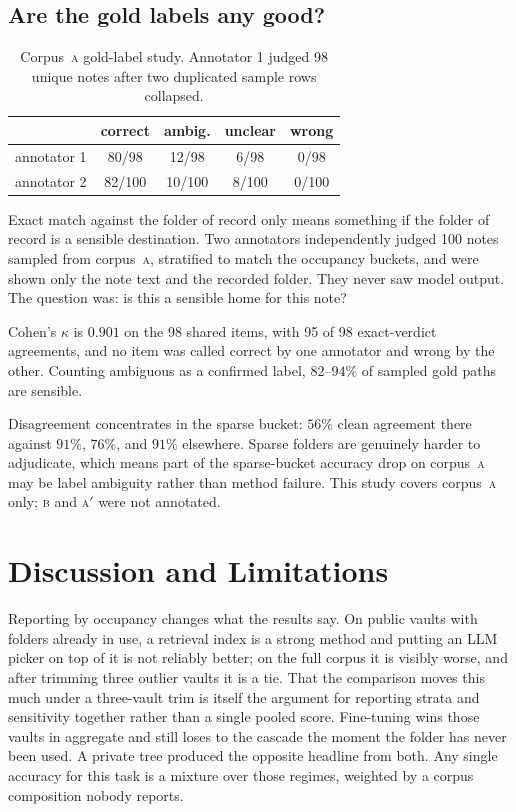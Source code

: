 \documentclass[11pt]{article}
\newcommand{\corpA}{\textsc{a}}
\newcommand{\corpB}{\textsc{b}}
\newcommand{\corpAp}{\textsc{a}$'$}
\begin{document}
\subsection{Are the gold labels any good?}
\label{sec:annotation}

\begin{table}[t]
  \centering
  \small
  \begin{tabular}{lcccc}
    \toprule
    & correct & ambig. & unclear & wrong \\
    \midrule
    annotator 1 & 80/98  & 12/98 & 6/98 & 0/98 \\
    annotator 2 & 82/100 & 10/100 & 8/100 & 0/100 \\
    \bottomrule
  \end{tabular}
  \caption{Corpus~\corpA{} gold-label study. Annotator 1 judged 98 unique notes after two duplicated sample rows collapsed.}
  \label{tab:annotation}
\end{table}

Exact match against the folder of record only means something if the folder of record is a sensible destination.
Two annotators independently judged 100 notes sampled from corpus~\corpA{}, stratified to match the occupancy buckets, and were shown only the note text and the recorded folder.
They never saw model output.
The question was: is this a sensible home for this note?

Cohen's $\kappa$ is $0.901$ on the 98 shared items, with 95 of 98 exact-verdict agreements, and no item was called correct by one annotator and wrong by the other.
Counting ambiguous as a confirmed label, $82$--$94\%$ of sampled gold paths are sensible.

Disagreement concentrates in the sparse bucket: $56\%$ clean agreement there against $91\%$, $76\%$, and $91\%$ elsewhere.
Sparse folders are genuinely harder to adjudicate, which means part of the sparse-bucket accuracy drop on corpus~\corpA{} may be label ambiguity rather than method failure.
This study covers corpus~\corpA{} only; \corpB{} and \corpAp{} were not annotated.

\section{Discussion and Limitations}
\label{sec:discussion}

Reporting by occupancy changes what the results say.
On public vaults with folders already in use, a retrieval index is a strong method and putting an LLM picker on top of it is not reliably better; on the full corpus it is visibly worse, and after trimming three outlier vaults it is a tie.
That the comparison moves this much under a three-vault trim is itself the argument for reporting strata and sensitivity together rather than a single pooled score.
Fine-tuning wins those vaults in aggregate and still loses to the cascade the moment the folder has never been used.
A private tree produced the opposite headline from both.
Any single accuracy for this task is a mixture over those regimes, weighted by a corpus composition nobody reports.
\end{document}
